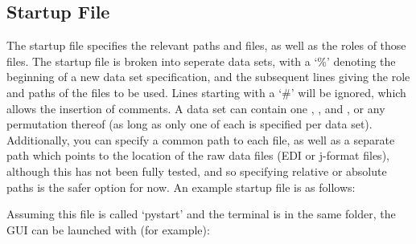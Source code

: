 \documentclass[letterpaper,10pt,english]{sphinxmanual}
\begin{document}
\subsection{Startup File}
\label{\detokenize{content/api_core/input_files:startup-file}}\label{\detokenize{content/api_core/input_files:id1}}
The startup file specifies the relevant paths and files, as well as the roles of those files.
The startup file is broken into seperate data sets, with a ‘\%’ denoting the beginning of a new data set specification, and the subsequent lines giving the role and paths of the files to be used. Lines starting with a ‘\#’ will be ignored, which allows the insertion of comments.
A data set can contain one {\hyperref[\detokenize{content/api_core/input_files:list-file}]{}}, {\hyperref[\detokenize{content/api_core/input_files:data-file}]{}}, and {\hyperref[\detokenize{content/api_core/input_files:response-file}]{}}, or any permutation thereof (as long as only one of each is specified per data set). Additionally, you can specify a common path to each file, as well as a separate path which points to the location of the raw data files (EDI or j-format files), although this has not been fully tested, and so specifying relative or absolute paths is the safer option for now.
An example startup file is as follows:

\begin{sphinxVerbatim}[commandchars=\\\{\}]
 
 
 
 
 
 
 
 
 
\end{sphinxVerbatim}

Assuming this file is called ‘pystart’ and the terminal is in the same folder, the GUI can be launched with (for example):
\end{document}

